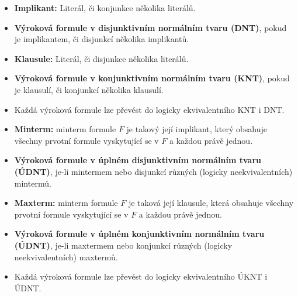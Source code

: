 \begin{itemize}
	\item \textbf{Implikant:} Literál, či konjunkce několika literálů.

	\item \textbf{Výroková formule v disjunktivním normálním tvaru (DNT)}, pokud je implikantem, či disjunkcí několika implikantů.

	\item \textbf{Klausule:} Literál, či disjunkce několika literálů.

	\item \textbf{Výroková formule v konjunktivním normálním tvaru (KNT)}, pokud je klausulí, či konjunkcí několika klausulí.

	\item Každá výroková formule lze převést do logicky ekvivalentního KNT i DNT.

	\item \textbf{Minterm:} minterm formule $F$ je takový její implikant, který obsahuje všechny prvotní formule vyskytující se v $F$ a každou právě jednou.

	\item \textbf{Výroková formule v úplném disjunktivním normálním tvaru (ÚDNT)}, je-li mintermem nebo disjunkcí různých (logicky neekvivalentních) mintermů.

	\item \textbf{Maxterm:} minterm formule $F$ je taková její klausule, která obsahuje všechny prvotní formule vyskytující se v $F$ a každou právě jednou.

	\item \textbf{Výroková formule v úplném konjunktivním normálním tvaru (ÚDNT)}, je-li maxtermem nebo konjunkcí různých (logicky neekvivalentních) maxtermů.

	\item Každá výroková formule lze převést do logicky ekvivalentního ÚKNT i ÚDNT.
\end{itemize}